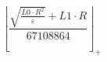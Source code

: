 \[\left\lfloor \frac{\sqrt{\frac{L0 \cdot R^{2}}{\varepsilon}} + L1 \cdot R}{67108864} \right\rfloor_{+}\]
